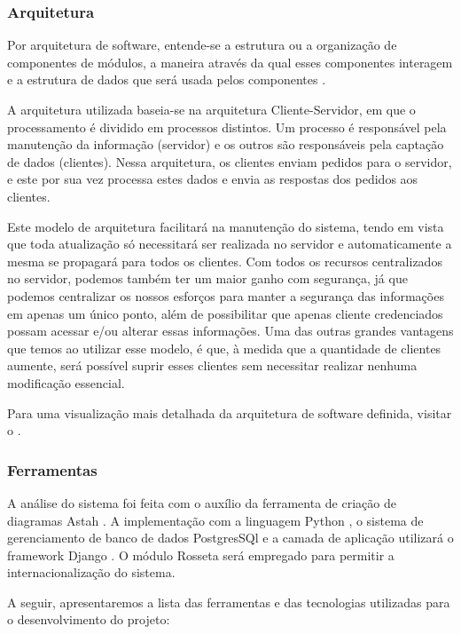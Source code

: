 \subsubsection{Arquitetura}
Por arquitetura de software, entende-se a estrutura ou a organização de componentes de módulos, a maneira através da qual esses componentes interagem e a estrutura de dados que será usada pelos componentes \cite{pressman2006engenharia}.

A arquitetura utilizada baseia-se na arquitetura Cliente-Servidor\cite{david2013everything}, em que o processamento é dividido em processos distintos. Um processo é responsável pela manutenção da 
informação (servidor) e os outros são responsáveis pela captação de dados (clientes). Nessa arquitetura, os clientes enviam pedidos para o servidor, e este por sua vez processa estes dados e envia as 
respostas dos pedidos aos clientes.

Este modelo de arquitetura facilitará na manutenção do sistema, tendo em vista que toda atualização só necessitará ser realizada no servidor e automaticamente a mesma se propagará para todos os 
clientes. Com todos os recursos centralizados no servidor, podemos também ter um maior ganho com segurança, já que podemos centralizar os nossos esforços para manter a segurança das informações em 
apenas um único ponto, além de possibilitar que apenas cliente credenciados possam acessar e/ou alterar essas informações. Uma das outras grandes vantagens que temos  ao utilizar esse modelo, é que, 
\`a medida que a quantidade de clientes aumente, será possível suprir esses clientes sem necessitar realizar nenhuma modificação essencial.

Para uma visualização mais detalhada da arquitetura de software definida, visitar o  .

\subsubsection{Ferramentas}

 A análise do sistema foi feita com o auxílio da ferramenta de criação de diagramas Astah \cite{astah2016}. A implementação com a linguagem Python \cite{vanrossum2010python}, o sistema de 
gerenciamento de banco de dados PostgresSQl \cite{momjian2001postgresql} e a camada de aplicação utilizar\'a o framework Django \cite{django2016}. O módulo Rosseta \cite{rosetta2016} ser\'a empregado 
para permitir a internacionalização do sistema.
 
A seguir, apresentaremos a lista das ferramentas e das tecnologias utilizadas para o desenvolvimento do projeto:

